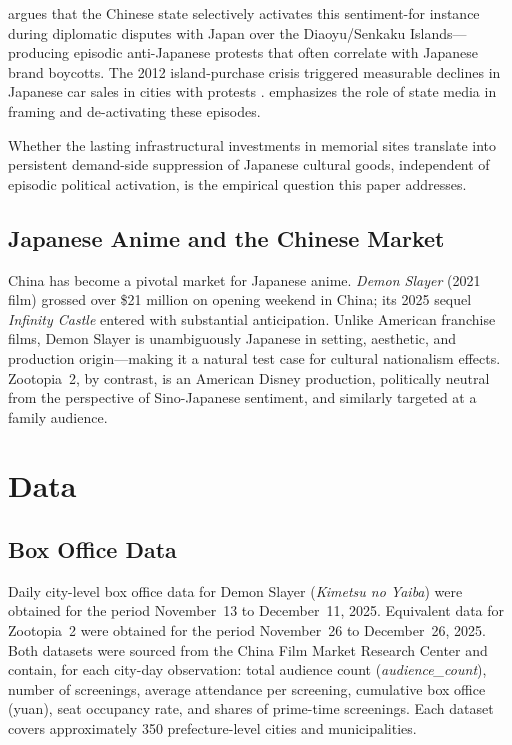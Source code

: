 \documentclass[12pt]{article}
\begin{document}
\citet{weiss2014} argues that the Chinese state selectively activates this sentiment-for instance during diplomatic disputes with Japan over the Diaoyu/Senkaku Islands---producing episodic anti-Japanese protests that often correlate with Japanese brand boycotts. The 2012 island-purchase crisis triggered measurable declines in Japanese car sales in cities with protests \citep{garcia2020}. \citet{shirk2007} emphasizes the role of state media in framing and de-activating these episodes.

Whether the lasting infrastructural investments in memorial sites translate into persistent demand-side suppression of Japanese cultural goods, independent of episodic political activation, is the empirical question this paper addresses.

\subsection{Japanese Anime and the Chinese Market}

China has become a pivotal market for Japanese anime. \textit{Demon Slayer} (2021 film) grossed over \$21 million on opening weekend in China; its 2025 sequel \textit{Infinity Castle} entered with substantial anticipation. Unlike American franchise films, Demon Slayer is unambiguously Japanese in setting, aesthetic, and production origin---making it a natural test case for cultural nationalism effects. Zootopia~2, by contrast, is an American Disney production, politically neutral from the perspective of Sino-Japanese sentiment, and similarly targeted at a family audience.

\section{Data}

\subsection{Box Office Data}

Daily city-level box office data for Demon Slayer (\textit{Kimetsu no Yaiba}) were obtained for the period November~13 to December~11, 2025. Equivalent data for Zootopia~2 were obtained for the period November~26 to December~26, 2025. Both datasets were sourced from the China Film Market Research Center and contain, for each city-day observation: total audience count (\textit{audience\_count}), number of screenings, average attendance per screening, cumulative box office (yuan), seat occupancy rate, and shares of prime-time screenings. Each dataset covers approximately 350 prefecture-level cities and municipalities.
\end{document}
